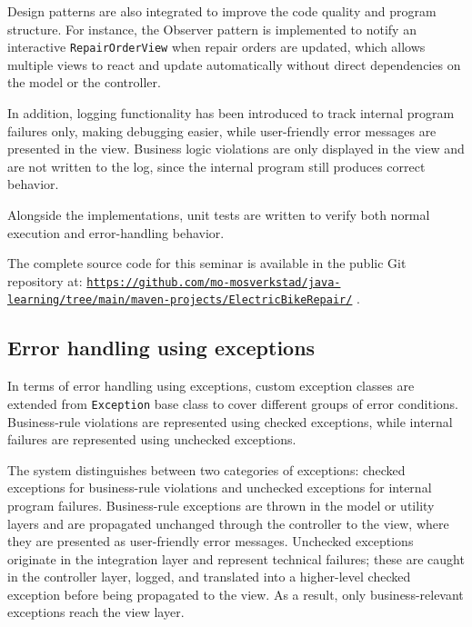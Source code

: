 \documentclass[a4paper]{scrartcl}
\begin{document}
Design patterns are also integrated to improve the code quality and program structure. For instance, the Observer pattern is implemented to notify an interactive \texttt{RepairOrderView} when repair orders are updated, which allows multiple views to react and update automatically without direct dependencies on the model or the controller.

In addition, logging functionality has been introduced to track internal program failures only, making debugging easier, while user-friendly error messages are presented in the view. Business logic violations are only displayed in the view and are not written to the log, since the internal program still produces correct behavior.

Alongside the implementations, unit tests are written to verify both normal execution and error-handling behavior.

The complete source code for this seminar is available in the public Git repository at: \href{https://github.com/mo-mosverkstad/java-learning/tree/main/maven-projects/ElectricBikeRepair/}{\nolinkurl{https://github.com/mo-mosverkstad/java-learning/tree/main/maven-projects/ElectricBikeRepair/}} \cite{sourcecode}.

\subsection{Error handling using exceptions}

In terms of error handling using exceptions, custom exception classes are extended from \texttt{Exception} base class to cover different groups of error conditions. Business-rule violations are represented using checked exceptions, while internal failures are represented using unchecked exceptions.


The system distinguishes between two categories of exceptions: checked exceptions for business-rule violations and unchecked exceptions for internal program failures. Business-rule exceptions are thrown in the model or utility layers and are propagated unchanged through the controller to the view, where they are presented as user-friendly error messages. Unchecked exceptions originate in the integration layer and represent technical failures; these are caught in the controller layer, logged, and translated into a higher-level checked exception before being propagated to the view. As a result, only business-relevant exceptions reach the view layer.
\end{document}
